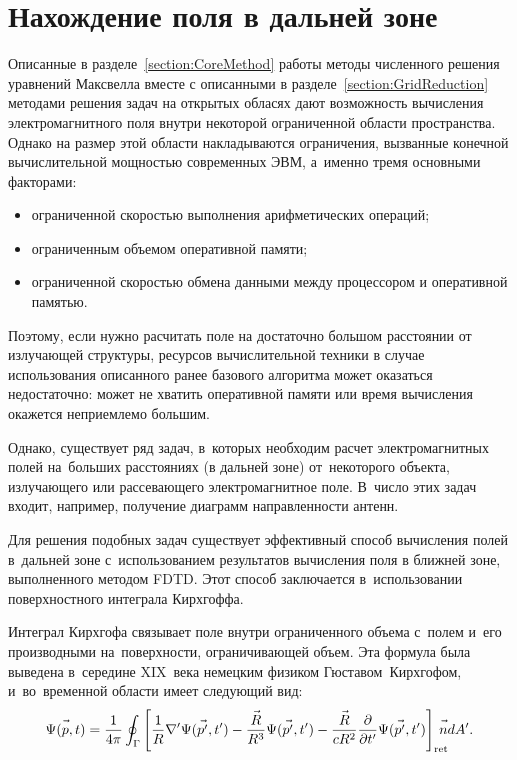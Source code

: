 

\section{Нахождение поля в дальней зоне}

Описанные в разделе~\ref{section:CoreMethod} работы методы численного решения
уравнений Максвелла вместе с описанными в разделе~\ref{section:GridReduction}
методами решения задач на открытых обласях дают возможность вычисления
электромагнитного поля внутри некоторой ограниченной области пространства.
Однако на размер этой области накладываются ограничения, вызванные конечной
вычислительной мощностью современных ЭВМ, а~именно тремя основными факторами:
\begin{itemize}
\item ограниченной скоростью выполнения арифметических операций;
\item ограниченным объемом оперативной памяти;
\item ограниченной скоростью обмена данными между процессором
      и оперативной памятью.
\end{itemize}
Поэтому, если нужно расчитать поле на достаточно большом расстоянии от излучающей
структуры, ресурсов вычислительной техники в случае использования описанного
ранее базового алгоритма может оказаться недостаточно: может не хватить
оперативной памяти или время вычисления окажется неприемлемо большим.

Однако, существует ряд задач, в~которых необходим расчет электромагнитных полей
на~больших расстояниях (в дальней зоне) от~некоторого объекта, излучающего или
рассевающего электромагнитное поле. В~число этих задач входит, например,
получение диаграмм направленности антенн.

Для решения подобных задач существует эффективный способ вычисления полей
в~дальней зоне с~использованием результатов вычисления поля в ближней зоне,
выполненного методом FDTD. Этот способ заключается в~использовании
поверхностного интеграла Кирхгоффа.

Интеграл Кирхгофа связывает поле внутри ограниченного объема с~полем и~его
производными на~поверхности, ограничивающей объем. Эта формула была выведена
в~середине XIX~века немецким физиком Гюставом~Кирхгофом, и~во~временной области
имеет следующий вид:
\begin{equation}
    \label{eq:KirchhoffIntegral}
    \Psi(\vec{p\mathstrut},t) = \frac{1}{4\pi} \oint_\Gamma
    \left[
        \frac{1}{R}\nabla'\Psi(\vec{p'\mathstrut},t') -
        \frac{\vec{R\mathstrut}}{R^3}\Psi(\vec{p'\mathstrut},t') -
        \frac{\vec{R\mathstrut}}{cR^2}\frac{\partial}{\partial t'}\Psi(\vec{p'\mathstrut},t')
    \right]_\text{ret} \!\!\!\!\!\vec{n\mathstrut} dA'.
\end{equation}

